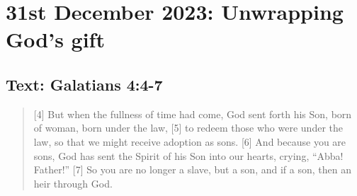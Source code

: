 \setcounter{figure}{0}

\section{31st December 2023: Unwrapping God's gift}
\subsection*{Text: Galatians 4:4-7}
  \begin{quote}
    [4] But when the fullness of time had come, God sent forth his Son, born of woman, born under the law, [5] to redeem those who were under the law, so that we might receive adoption as sons. [6] And because you are sons, God has sent the Spirit of his Son into our hearts, crying, “Abba! Father!” [7] So you are no longer a slave, but a son, and if a son, then an heir through God.
  \end{quote}
